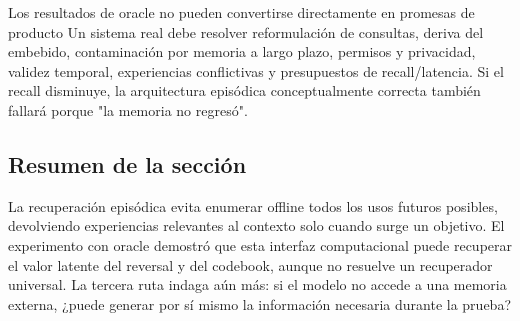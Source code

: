 
\begin{warningbox}{Los resultados de oracle no pueden convertirse directamente en promesas de producto}
Un sistema real debe resolver reformulación de consultas, deriva del embebido, contaminación por memoria a largo plazo, permisos y privacidad, validez temporal, experiencias conflictivas y presupuestos de recall/latencia. Si el recall disminuye, la arquitectura episódica conceptualmente correcta también fallará porque "la memoria no regresó".
\end{warningbox}

\subsection{Resumen de la sección}

La recuperación episódica evita enumerar offline todos los usos futuros posibles, devolviendo experiencias relevantes al contexto solo cuando surge un objetivo. El experimento con oracle demostró que esta interfaz computacional puede recuperar el valor latente del reversal y del codebook, aunque no resuelve un recuperador universal. La tercera ruta indaga aún más: si el modelo no accede a una memoria externa, ¿puede generar por sí mismo la información necesaria durante la prueba?


